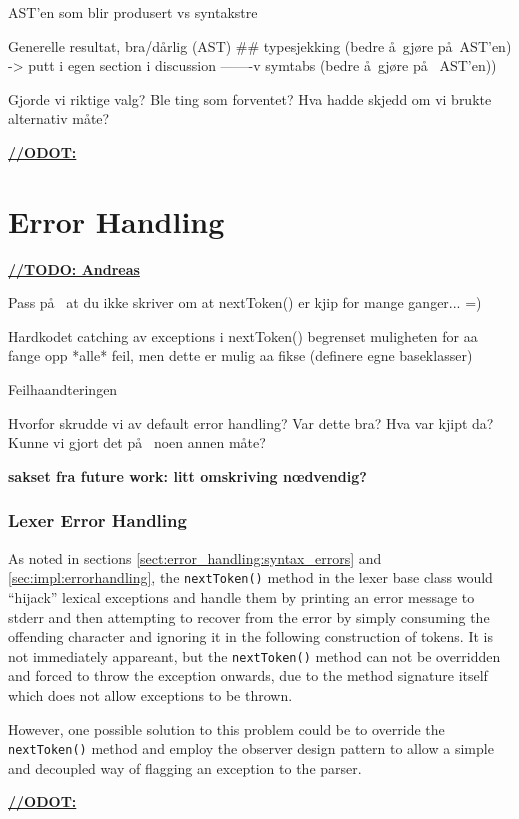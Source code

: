 AST'en som blir produsert vs syntakstre

Generelle resultat, bra/d\aa rlig (AST) \#\# typesjekking (bedre \aa~gj\o re p\aa~AST'en) -> putt i egen section i discussion -------v
symtabs (bedre \aa~gj\o re p\aa~ AST'en))

Gjorde vi riktige valg? Ble ting som forventet? Hva hadde skjedd om vi brukte alternativ m\aa te? 

\underline{\textbf{\LARGE //ODOT:}}

\section{Error Handling}
\underline{\textbf{\LARGE //TODO: Andreas}}

Pass p\aa~ at du ikke skriver om at nextToken() er kjip for mange ganger... =)

Hardkodet catching av exceptions i nextToken() begrenset muligheten for aa
fange opp *alle* feil, men dette er mulig aa fikse (definere egne baseklasser)

Feilhaandteringen

Hvorfor skrudde vi av default error handling? Var dette bra? Hva var kjipt da? Kunne vi gjort det p\aa~ noen annen m\aa te?


\textbf{sakset fra future work: litt omskriving n\oe dvendig?}
\subsubsection{Lexer Error Handling}
\label{sect:future_work:lexer_error_handling}
As noted in sections \ref{sect:error_handling:syntax_errors} and
\ref{sec:impl:errorhandling}, the \verb!nextToken()! method in the lexer base class
would ``hijack'' lexical exceptions and handle them by printing an error message
to stderr and then attempting to recover from the error by simply consuming the
offending character and ignoring it in the following construction of tokens. It is 
not immediately appareant, but the \verb!nextToken()! method can not be overridden and
forced to throw the exception onwards, due to the method signature itself which
does not allow exceptions to be thrown. 

However, one possible solution to this problem could be to override the \verb!nextToken()! method and employ the observer design pattern to allow a simple and decoupled way of flagging an exception to the parser.



\underline{\textbf{\LARGE //ODOT:}}


